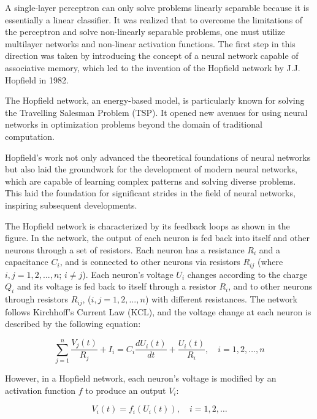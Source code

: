 \documentclass[12pt,a4paper]{report}
\begin{document}
A single-layer perceptron can only solve problems linearly separable because it is essentially a linear classifier. It was realized that to overcome the limitations of the perceptron and solve non-linearly separable problems, one must utilize multilayer networks and non-linear activation functions. The first step in this direction was taken by introducing the concept of a neural network capable of associative memory, which led to the invention of the Hopfield network by J.J. Hopfield in 1982.

The Hopfield network, an energy-based model, is particularly known for solving the Travelling Salesman Problem (TSP). It opened new avenues for using neural networks in optimization problems beyond the domain of traditional computation.

Hopfield's work not only advanced the theoretical foundations of neural networks but also laid the groundwork for the development of modern neural networks, which are capable of learning complex patterns and solving diverse problems. This laid the foundation for significant strides in the field of neural networks, inspiring subsequent developments.

The Hopfield network is characterized by its feedback loops as shown in the figure. In the network, the output of each neuron is fed back into itself and other neurons through a set of resistors. Each neuron has a resistance \( R_i \) and a capacitance \( C_i \), and is connected to other neurons via resistors \( R_{ij} \) (where \( i,j = 1,2,...,n \); \( i \neq j \)). Each neuron's voltage \( U_i \) changes according to the charge \( Q_i \) and its voltage is fed back to itself through a resistor \( R_i \), and to other neurons through resistors \( R_{ij} \), (\( i,j = 1,2,...,n \)) with different resistances. The network follows Kirchhoff's Current Law (KCL), and the voltage change at each neuron is described by the following equation:

\begin{equation}
    \sum_{j=1}^{n} \frac{V_j(t)}{R_j} + I_i = C_i \frac{dU_i(t)}{dt} + \frac{U_i(t)}{R_i}, \quad i = 1, 2, \ldots, n
\end{equation}

However, in a Hopfield network, each neuron's voltage is modified by an activation function \( f \) to produce an output \( V_i \):

\begin{equation}
    V_i(t) = f_i(U_i(t)), \quad i = 1, 2, \ldots
\end{equation}
\end{document}
